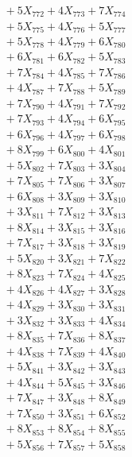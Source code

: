 \documentclass[a4paper,10pt]{article}
\begin{document}
{\begin{align}
&\;  + 5 X_{772} + 4 X_{773} + 7 X_{774} \\[0.3ex]
&\;  + 5 X_{775} + 4 X_{776} + 5 X_{777} \\[0.3ex]
&\;  + 5 X_{778} + 4 X_{779} + 6 X_{780} \\[0.3ex]
&\;  + 6 X_{781} + 6 X_{782} + 5 X_{783} \\[0.3ex]
&\;  + 7 X_{784} + 4 X_{785} + 7 X_{786} \\[0.3ex]
&\;  + 4 X_{787} + 7 X_{788} + 5 X_{789} \\[0.5ex]\allowbreak
&\;  + 7 X_{790} + 4 X_{791} + 7 X_{792} \\[0.3ex]
&\;  + 7 X_{793} + 4 X_{794} + 6 X_{795} \\[0.3ex]
&\;  + 6 X_{796} + 4 X_{797} + 6 X_{798} \\[0.3ex]
&\;  + 8 X_{799} + 6 X_{800} + 4 X_{801} \\[0.3ex]
&\;  + 5 X_{802} + 7 X_{803} + 3 X_{804} \\[0.3ex]
&\;  + 7 X_{805} + 7 X_{806} + 3 X_{807} \\[0.3ex]
&\;  + 6 X_{808} + 3 X_{809} + 3 X_{810} \\[0.3ex]
&\;  + 3 X_{811} + 7 X_{812} + 3 X_{813} \\[0.3ex]
&\;  + 8 X_{814} + 3 X_{815} + 3 X_{816} \\[0.3ex]
&\;  + 7 X_{817} + 3 X_{818} + 3 X_{819} \\[0.5ex]\allowbreak
&\;  + 5 X_{820} + 3 X_{821} + 7 X_{822} \\[0.3ex]
&\;  + 8 X_{823} + 7 X_{824} + 4 X_{825} \\[0.3ex]
&\;  + 4 X_{826} + 4 X_{827} + 3 X_{828} \\[0.3ex]
&\;  + 4 X_{829} + 3 X_{830} + 3 X_{831} \\[0.3ex]
&\;  + 3 X_{832} + 3 X_{833} + 4 X_{834} \\[0.3ex]
&\;  + 8 X_{835} + 7 X_{836} + 8 X_{837} \\[0.3ex]
&\;  + 4 X_{838} + 7 X_{839} + 4 X_{840} \\[0.3ex]
&\;  + 5 X_{841} + 3 X_{842} + 3 X_{843} \\[0.3ex]
&\;  + 4 X_{844} + 5 X_{845} + 3 X_{846} \\[0.3ex]
&\;  + 7 X_{847} + 3 X_{848} + 8 X_{849} \\[0.5ex]\allowbreak
&\;  + 7 X_{850} + 3 X_{851} + 6 X_{852} \\[0.3ex]
&\;  + 8 X_{853} + 8 X_{854} + 8 X_{855} \\[0.3ex]
&\;  + 5 X_{856} + 7 X_{857} + 5 X_{858} \\[0.3ex]

\end{align}}
\end{document}
